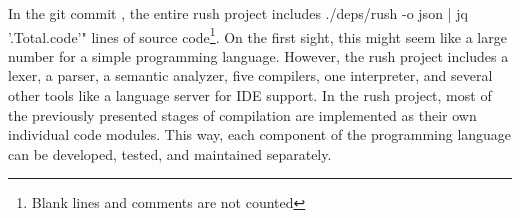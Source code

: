 In the git commit \rushCommit, the entire rush project includes
 ./deps/rush -o json | jq '.Total.code'" lines of source code\footnote{Blank lines and comments are not counted}.
On the first sight, this might seem like a large number for a simple programming language.
However, the rush project includes a lexer, a parser, a semantic analyzer, five compilers, one interpreter, and several other tools like a language server for IDE support.
In the rush project, most of the previously presented stages of compilation are implemented as their own individual code modules.
This way, each component of the programming language can be developed, tested, and maintained separately.
